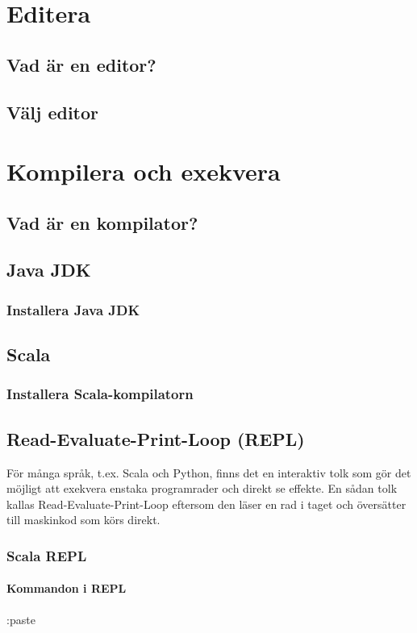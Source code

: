 \documentclass[a4paper]{compendium}
\begin{document}
\chapter{Editera}
\section{Vad är en editor?}
\section{Välj editor}

\chapter{Kompilera och exekvera}
\section{Vad är en kompilator?}
\section{Java JDK}
\subsection{Installera Java JDK}
\section{Scala}
\subsection{Installera Scala-kompilatorn}
\section{Read-Evaluate-Print-Loop (REPL)}
För många språk, t.ex. Scala och Python, finns det en interaktiv tolk som gör det möjligt att exekvera enstaka programrader och direkt se effekte. En sådan tolk kallas Read-Evaluate-Print-Loop eftersom den läser en rad i taget och översätter till maskinkod som körs direkt.    
\subsection{Scala REPL}
\subsubsection{Kommandon i REPL}
:paste
\end{document}
